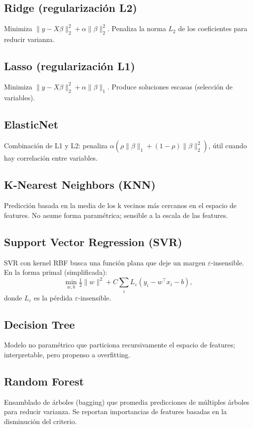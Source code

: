 \documentclass[11pt,a4paper]{article}
\begin{document}
\subsection{Ridge (regularización L2)}
Minimiza \(\|y - X\beta\|_2^2 + \alpha \|\beta\|_2^2\). Penaliza la norma \(L_2\) de los coeficientes para reducir varianza.

\subsection{Lasso (regularización L1)}
Minimiza \(\|y - X\beta\|_2^2 + \alpha \|\beta\|_1\). Produce soluciones escasas (selección de variables).

\subsection{ElasticNet}
Combinación de L1 y L2: penaliza \(\alpha(\rho \|\beta\|_1 + (1-\rho) \|\beta\|_2^2)\), útil cuando hay correlación entre variables.

\subsection{K-Nearest Neighbors (KNN)}
Predicción basada en la media de los k vecinos más cercanos en el espacio de features. No asume forma paramétrica; sensible a la escala de las features.

\subsection{Support Vector Regression (SVR)}
SVR con kernel RBF busca una función plana que deje un margen \(\varepsilon\)-insensible. En la forma primal (simplificada):
\[ \min_{w,b} \tfrac{1}{2} \|w\|^2 + C \sum_i L_{\varepsilon}(y_i - w^\top x_i - b), \]
donde \(L_{\varepsilon}\) es la pérdida \(\varepsilon\)-insensible.

\subsection{Decision Tree}
Modelo no paramétrico que particiona recursivamente el espacio de features; interpretable, pero propenso a overfitting.

\subsection{Random Forest}
Ensamblado de árboles (bagging) que promedia predicciones de múltiples árboles para reducir varianza. Se reportan importancias de features basadas en la disminución del criterio.
\end{document}
